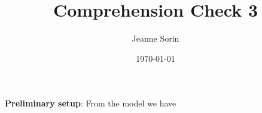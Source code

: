 \documentclass[10pt, final]{article}
\title{Comprehension Check 3}
\author{Jeanne Sorin}
\date{\today}
\begin{document}
\maketitle
\newcommand{\hatxi}{\hat{\mathbf{x}}^i}
\newcommand{\tildexi}{\tilde{\mathbf{x}}^i}


\maketitle

\textbf{Preliminary setup}:
From the model we have
\end{document}
